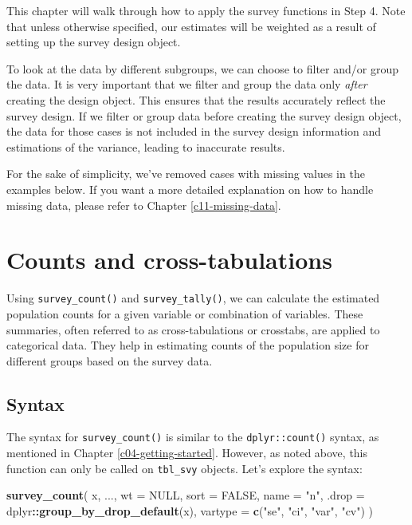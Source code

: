 \documentclass[
]{krantz}
\makeatletter
\newenvironment{Shaded}{\begin{snugshade}}{\end{snugshade}}
\newcommand{\AttributeTok}[1]{\textcolor[rgb]{0.27,0.27,0.27}{#1}}
\newcommand{\ConstantTok}[1]{\textcolor[rgb]{0.37,0.37,0.37}{#1}}
\newcommand{\FunctionTok}[1]{\textcolor[rgb]{0.27,0.27,0.27}{\textbf{#1}}}
\newcommand{\NormalTok}[1]{#1}
\newcommand{\SpecialCharTok}[1]{\textcolor[rgb]{0.43,0.43,0.43}{\textbf{#1}}}
\newcommand{\StringTok}[1]{\textcolor[rgb]{0.5,0.5,0.5}{#1}}
\newenvironment{kframe}{%
\medskip{}
\setlength{\fboxsep}{.8em}
 \def\at@end@of@kframe{}%
 \ifinner\ifhmode%
  \def\at@end@of@kframe{\end{minipage}}%
  \begin{minipage}{\columnwidth}%
 \fi\fi%
 \def\FrameCommand##1{\hskip\@totalleftmargin \hskip-\fboxsep
 \colorbox{shadecolor}{##1}\hskip-\fboxsep
     \hskip-\linewidth \hskip-\@totalleftmargin \hskip\columnwidth}%
 \MakeFramed {\advance\hsize-\width
   \@totalleftmargin\z@ \linewidth\hsize
   \@setminipage}}%
 {\par\unskip\endMakeFramed%
 \at@end@of@kframe}
\renewenvironment{Shaded}{\begin{kframe}}{\end{kframe}}
\makeatother
\begin{document}
This chapter will walk through how to apply the survey functions in Step 4. Note that unless otherwise specified, our estimates will be weighted as a result of setting up the survey design object.

To look at the data by different subgroups, we can choose to filter and/or group the data. It is very important that we filter and group the data only \emph{after} creating the design object. This ensures that the results accurately reflect the survey design. If we filter or group data before creating the survey design object, the data for those cases is not included in the survey design information and estimations of the variance, leading to inaccurate results.

For the sake of simplicity, we've removed cases with missing values in the examples below. If you want a more detailed explanation on how to handle missing data, please refer to Chapter \ref{c11-missing-data}.

\hypertarget{counts-and-cross-tabulations}{%
\section{Counts and cross-tabulations}\label{counts-and-cross-tabulations}}

Using \texttt{survey\_count()} and \texttt{survey\_tally()}, we can calculate the estimated population counts for a given variable or combination of variables. These summaries, often referred to as cross-tabulations or crosstabs, are applied to categorical data. They help in estimating counts of the population size for different groups based on the survey data.

\hypertarget{desc-count-syntax}{%
\subsection{Syntax}\label{desc-count-syntax}}

The syntax for \texttt{survey\_count()} is similar to the \texttt{dplyr::count()} syntax, as mentioned in Chapter \ref{c04-getting-started}. However, as noted above, this function can only be called on \texttt{tbl\_svy} objects. Let's explore the syntax:

\begin{Shaded}
\begin{Highlighting}[]
\FunctionTok{survey\_count}\NormalTok{(}
\NormalTok{  x,}
\NormalTok{  ...,}
  \AttributeTok{wt =} \ConstantTok{NULL}\NormalTok{,}
  \AttributeTok{sort =} \ConstantTok{FALSE}\NormalTok{,}
  \AttributeTok{name =} \StringTok{"n"}\NormalTok{,}
  \AttributeTok{.drop =}\NormalTok{ dplyr}\SpecialCharTok{::}\FunctionTok{group\_by\_drop\_default}\NormalTok{(x),}
  \AttributeTok{vartype =} \FunctionTok{c}\NormalTok{(}\StringTok{"se"}\NormalTok{, }\StringTok{"ci"}\NormalTok{, }\StringTok{"var"}\NormalTok{, }\StringTok{"cv"}\NormalTok{)}
\NormalTok{  )}
\end{Highlighting}
\end{Shaded}
\end{document}
